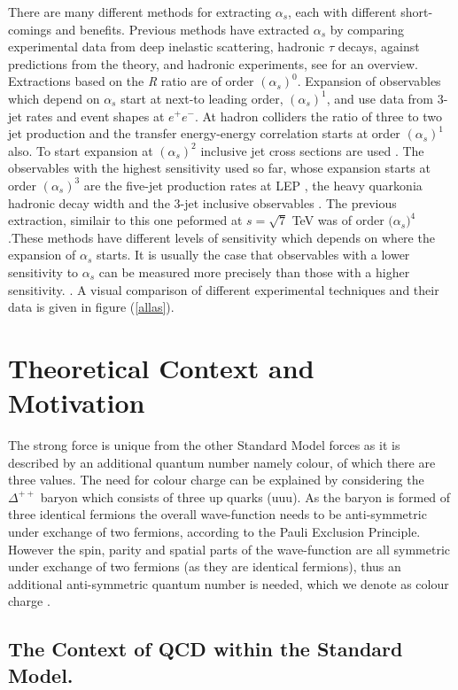 \documentclass[12pt, onecolumn, nofootinbib]{revtex4}    %
\begin{document}
There are many different methods for extracting ${\alpha_s}$, each with different short-comings and benefits. Previous methods have extracted ${\alpha_s}$ by comparing experimental data from deep inelastic scattering,  hadronic ${\tau}$ decays, against predictions from the theory,  and hadronic experiments, see \cite{PPB} for an overview. Extractions based on the \textit{R} ratio are of order ${(\alpha_s)^0}$. Expansion of observables which depend on ${\alpha_s}$ start at next-to leading order, ${(\alpha_s)^1}$, and use data from 3-jet rates and event shapes at ${e^+e^-}$. At hadron colliders the ratio of three to two jet production \cite{2to3} and the transfer energy-energy correlation \cite{en2en} starts at order ${(\alpha_s)^1}$ also. To start expansion at ${(\alpha_s)^2}$ inclusive jet cross sections are used \cite{inc}. The observables with the highest sensitivity used so far, whose expansion starts at order ${(\alpha_s)^3}$ are  the five-jet production rates at LEP \cite{LEP}, the heavy quarkonia hadronic decay width \cite{HAD} and the 3-jet inclusive observables \cite{3jet}. The previous extraction, similair to this one peformed at ${s=\sqrt{7}}$ TeV was of order ${(\alpha_s})^4$ \cite{DMP}.These methods have different levels of sensitivity which depends on where the expansion of ${\alpha_s}$ starts. It is usually the case that observables with a lower sensitivity to ${\alpha_s}$ can be measured more precisely than those with a higher sensitivity. \cite{DMP}. A visual comparison of different experimental techniques and their data is given in figure (\ref{allas}). 

\section{Theoretical Context and Motivation} 
The strong force is unique from the other Standard Model forces as it is described by an additional quantum number namely colour, of which there are three values. The need for colour charge can be explained by considering the ${\Delta^{++}}$ baryon which consists of three up quarks (uuu). As the baryon is formed of three identical fermions the overall wave-function needs to be anti-symmetric under exchange of two fermions, according to the Pauli Exclusion Principle. However the spin, parity and spatial parts of the wave-function are all symmetric under exchange of two fermions (as they are identical fermions), thus an additional anti-symmetric quantum number is needed, which we denote as colour charge \cite{BOOK}.
\subsection{The Context of QCD within the Standard Model.}
\end{document}
